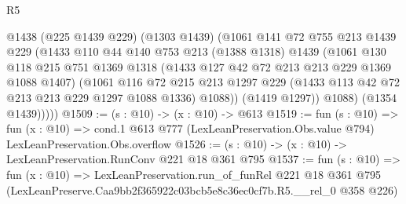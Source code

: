 \begin{lexlean}{R5}
\begin{coremodule}
          @1438
            (@225 @1439 @229)
            (@1303 @1439)
            (@1061
              @141
              @72
              @755
              @213
              @1439
              @229
              (@1433
                @110
                @44
                @140
                @753
                @213
                (@1388 @1318)
                @1439
                (@1061
                  @130
                  @118
                  @215
                  @751
                  @1369
                  @1318
                  (@1433 @127 @42 @72 @213 @213 @229 @1369 @1088 @1407)
                  (@1061
                    @116
                    @72
                    @215
                    @213
                    @1297
                    @229
                    (@1433 @113 @42 @72 @213 @213 @229 @1297 @1088 @1336)
                    @1088))
                (@1419 @1297))
              @1088)
            (@1354 @1439)))))
@1509 := (s : @10) -> (x : @10) -> @613
@1519 := fun (s : @10) =>
  fun (x : @10) =>
  cond.{1} @613 @777 (LexLeanPreservation.Obs.value @794) LexLeanPreservation.Obs.overflow
@1526 := (s : @10) -> (x : @10) -> LexLeanPreservation.RunConv @221 @18 @361 @795
@1537 := fun (s : @10) =>
  fun (x : @10) =>
  LexLeanPreservation.run_of_funRel
    @221
    @18
    @361
    @795
    (LexLeanPreserve.Caa9bb2f365922c03bcb5e8c36ec0cf7b.R5.__rel_0 @358 @226)
\end{coremodule}
\end{lexlean}
